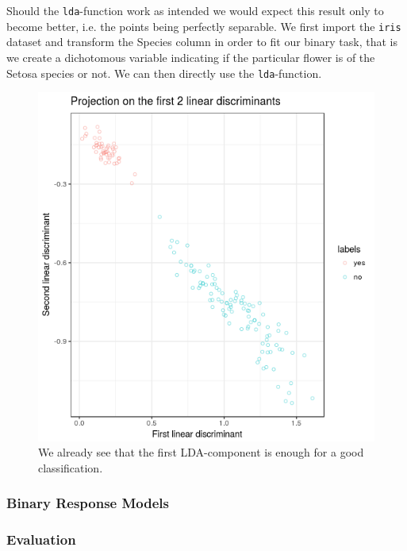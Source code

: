 \documentclass{article}
\begin{document}
Should the \texttt{lda}-function work as intended we would expect this result only to become better, i.e. the points being perfectly separable. We first import the \texttt{iris} dataset and transform the Species column in order to fit our binary task, that is we create a dichotomous variable indicating if the particular flower is of the Setosa species or not. We can then directly use the \texttt{lda}-function.



\begin{figure}
\label{irisLDA}
\begin{center}
\includegraphics[scale=0.3, trim={10mm 20mm 30mm 30mm}]{../LDA/irisLDA.png}
\end{center}
\caption{We already see that the first LDA-component is enough for a good classification.}
\end{figure}

\subsubsection{Binary Response Models}
\subsubsection{Evaluation}
\end{document}
